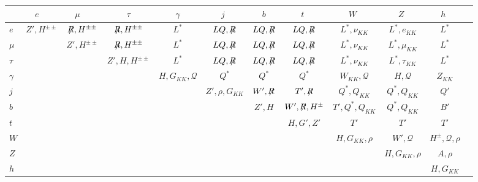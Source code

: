 \begin{table}

\begin{tabular}{lccccccccccc}
\hline
\hline
 & $e$\ \   & $\mu$\ \   & \ \  $\tau$\ \   & \ \  $\gamma$\ \   & \ \  $j$ \ \   & \ \  $b$\ \  & \ \ $t$ \ \ & \ \ $W$ \ \ & \ \ $Z$ \ \ & \ \ $h$ \ \   \\
\hline
$e$ &  $Z',H^{\pm\pm} $ & $\not \! \! R,H^{\pm\pm} $ & $\not \! \! R,H^{\pm\pm} $ & $L^*$  & $LQ,\not \!\! R$ & $LQ, \not \!\! R$ & $LQ,\not \!\! R$ & $L^*, \nu_{KK}$ & $L^*, e_{KK}$ & $L^*$ \\
$ \mu $ &  & $Z',H^{\pm\pm}$ & $\not \! \! R,H^{\pm\pm} $ & $L^*$  & $LQ,\not \!\! R$ & $LQ, \not \!\! R$ & $LQ,\not \!\! R$ & $L^*, \nu_{KK}$ & $L^*, \mu_{KK}$ & $L^*$ \\
$\tau$ &  &  & $Z',H,H^{\pm\pm}$ & $L^*$ & $LQ, \not \!\! R$ & $LQ,\not \!\! R$ & $LQ,\not \!\! R$ & $L^*, \nu_{KK}$ & $L^*, \tau_{KK}$ & $L^*$ \\
$\gamma$ &  & & & $H, G_{KK}, \mathcal{Q}$ & $Q^*$ & $Q^*$ & $Q^*$ & $W_{KK}, \mathcal{Q}$ & $H, \mathcal{Q}$ & $Z_{KK}$\\
$j$ &  &  &  &  & $Z',\rho, G_{KK}$ & $W',\not \!\! R$ & $T', \not \!\! R$ & $Q^*, Q_{KK}$  & $Q^*, Q_{KK}$  & $Q'$\\
$b$  &  &  &  &  &  & $Z',H$ & $W', \not \!\! R, H^\pm$ &  $T',Q^*, Q_{KK}$  & $Q^*, Q_{KK}$  & $B'$\\
$t$ &  &  &  &  &  &   & $H,G',Z'$ & $T'$ & $T'$  & $T'$\\
$W$ &  &  &  &  &  &  &  & $H, G_{KK}, \rho$ & $W', \mathcal{Q}$ & $H^\pm, \mathcal{Q}, \rho$ \\
$Z$ &  &  &  &  &  &  &  &  & $H, G_{KK}, \rho$ & $A, \rho$   \\
$h$ &  &  &  &  &  &  &  &  &  & $H, G_{KK}$ \\

\hline
\hline
\end{tabular}
\label{tab:restheory}
\end{table}



